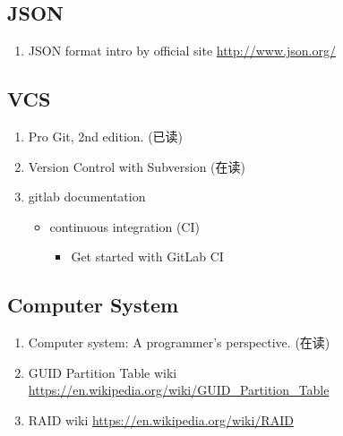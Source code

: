 \documentclass{article}
\begin{document}
\subsection{JSON}
\begin{enumerate}
    \item JSON format intro by official site \url{http://www.json.org/}
\end{enumerate}
\subsection{VCS}
\begin{enumerate}
    \item Pro Git, 2nd edition. (已读)
    \item Version Control with Subversion (在读)
    \item gitlab documentation
        \begin{itemize}
            \item continuous integration (CI)
                \begin{itemize}
                    \item Get started with GitLab CI
                \end{itemize}
        \end{itemize}
\end{enumerate}
\subsection{Computer System}
\begin{enumerate}
    \item Computer system: A programmer's perspective. (在读)
    \item GUID Partition Table wiki \url{https://en.wikipedia.org/wiki/GUID_Partition_Table}
    \item RAID wiki \url{https://en.wikipedia.org/wiki/RAID}
\end{enumerate}
\end{document}
